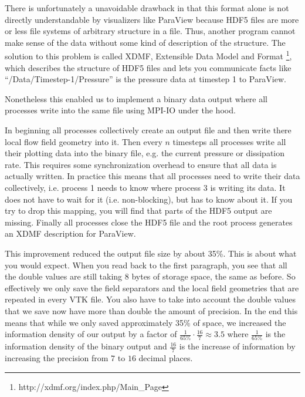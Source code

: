 There is unfortunately a unavoidable drawback in that this
format alone is not directly understandable by visualizers like ParaView because
HDF5 files are more or less file systems of arbitrary structure in a file. Thus,
another program cannot make sense of the data without some kind of description
of the structure. The solution to this problem is called XDMF, Extensible Data
Model and Format \footnote{http://xdmf.org/index.php/Main\_Page}, which
describes the structure of HDF5 files and lets you communicate facts like
``/Data/Timestep-1/Pressure'' is the pressure data at timestep 1 to ParaView.

Nonetheless this enabled us to implement a binary data output where all
processes write into the same file using MPI-IO under the hood.


In beginning all processes collectively create an output file and then write
there local flow field geometry into it. Then every $n$ timesteps all processes
write all their plotting data into the binary file, e.g. the current pressure or
dissipation rate. This requires some synchronization overhead to ensure that all
data is actually written. In practice this means that all processes need to
write their data collectively, i.e. process 1 needs to know where process 3 is
writing its data. It does not have to wait for it (i.e. non-blocking), but has to
know about it. If you try to drop this mapping, you will find that parts
of the HDF5 output are missing. Finally all processes close the HDF5 file and
the root process generates an XDMF description for ParaView.

This improvement reduced the output file size by about 35\%. This is about what
you would expect. When you read back to the first paragraph, you see that all
the double values are still taking 8 bytes of storage space, the same as
before. So effectively we only save the field separators and the local field
geometries that are repeated in every VTK file. You also have to take into
account the double values that we save now have more than double the amount of
precision. In the end this means that while we only saved approximately 35\% of
space, we increased the information density of our output by a factor of
$\frac{1}{65\%} \cdot \frac{16}{7} \approx 3.5$ where $\frac{1}{65\%}$ is the
information density of the binary output and $\frac{16}{7}$ is the increase of
information by increasing the precision from $7$ to $16$ decimal places.


